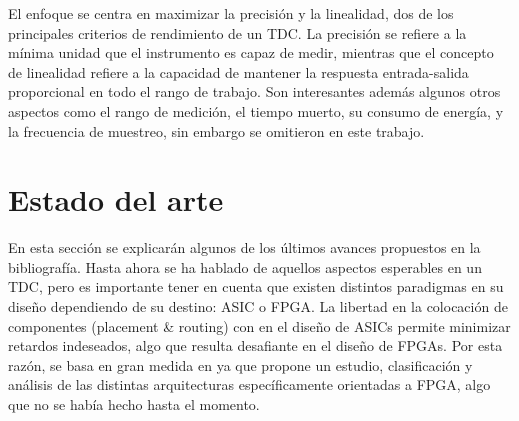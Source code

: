 El enfoque se centra en maximizar la precisión y la linealidad, dos de los principales criterios de rendimiento de un TDC.
La precisión se refiere a la mínima unidad que el instrumento es capaz de medir, mientras que el concepto de linealidad refiere
a la capacidad de mantener la respuesta entrada-salida proporcional en todo el rango de trabajo. 
Son interesantes además algunos
otros aspectos como el rango de medición, el tiempo muerto, su consumo de energía, y la frecuencia de muestreo,
sin embargo se omitieron en este trabajo.\\

\clearpage





\section{Estado del arte}
En esta sección se explicarán algunos de los últimos avances propuestos en la bibliografía. Hasta ahora se ha hablado de
aquellos aspectos esperables en un TDC, pero es importante tener en cuenta que existen distintos paradigmas en su diseño dependiendo
de su destino: ASIC o FPGA. La libertad en la colocación de componentes (placement \& routing) con 
en el diseño de ASICs permite minimizar retardos indeseados, algo que resulta desafiante en el diseño de FPGAs. Por esta razón,
se basa en gran medida en \cite{Machado} ya que propone un estudio, clasificación y análisis de las distintas 
arquitecturas específicamente orientadas a FPGA, algo que no se había hecho hasta el momento.\\

